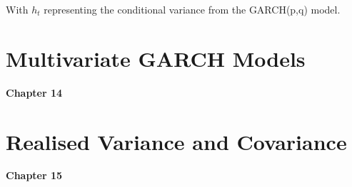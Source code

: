 \documentclass[11pt]{article}
\begin{document}
With $h_t$ representing the conditional variance from the GARCH(p,q) model.
 






























\newpage
\section{Multivariate GARCH Models}
\textbf{Chapter 14}

\newpage
\section{Realised Variance and Covariance}
\textbf{Chapter 15}
\end{document}
